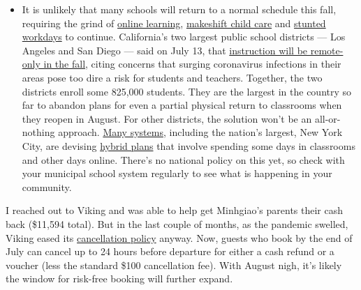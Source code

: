 \begin{itemize}
  \begin{itemize}
  \tightlist
  \item
    It is unlikely that many schools will return to a normal schedule
    this fall, requiring the grind of
    \href{https://www.nytimes3xbfgragh.onion/2020/06/05/us/coronavirus-education-lost-learning.html?action=click\&pgtype=Article\&state=default\&region=MAIN_CONTENT_3\&context=storylines_faq}{online
    learning},
    \href{https://www.nytimes3xbfgragh.onion/2020/05/29/us/coronavirus-child-care-centers.html?action=click\&pgtype=Article\&state=default\&region=MAIN_CONTENT_3\&context=storylines_faq}{makeshift
    child care} and
    \href{https://www.nytimes3xbfgragh.onion/2020/06/03/business/economy/coronavirus-working-women.html?action=click\&pgtype=Article\&state=default\&region=MAIN_CONTENT_3\&context=storylines_faq}{stunted
    workdays} to continue. California's two largest public school
    districts --- Los Angeles and San Diego --- said on July 13, that
    \href{https://www.nytimes3xbfgragh.onion/2020/07/13/us/lausd-san-diego-school-reopening.html?action=click\&pgtype=Article\&state=default\&region=MAIN_CONTENT_3\&context=storylines_faq}{instruction
    will be remote-only in the fall}, citing concerns that surging
    coronavirus infections in their areas pose too dire a risk for
    students and teachers. Together, the two districts enroll some
    825,000 students. They are the largest in the country so far to
    abandon plans for even a partial physical return to classrooms when
    they reopen in August. For other districts, the solution won't be an
    all-or-nothing approach.
    \href{https://bioethics.jhu.edu/research-and-outreach/projects/eschool-initiative/school-policy-tracker/}{Many
    systems}, including the nation's largest, New York City, are
    devising
    \href{https://www.nytimes3xbfgragh.onion/2020/06/26/us/coronavirus-schools-reopen-fall.html?action=click\&pgtype=Article\&state=default\&region=MAIN_CONTENT_3\&context=storylines_faq}{hybrid
    plans} that involve spending some days in classrooms and other days
    online. There's no national policy on this yet, so check with your
    municipal school system regularly to see what is happening in your
    community.
  \end{itemize}
\end{itemize}

I reached out to Viking and was able to help get Minhgiao's parents
their cash back (\$11,594 total). But in the last couple of months, as
the pandemic swelled, Viking eased its
\href{https://www.vikingcruises.com/oceans/risk-free-guarantee.html}{cancellation
policy} anyway. Now, guests who book by the end of July can cancel up to
24 hours before departure for either a cash refund or a voucher (less
the standard \$100 cancellation fee). With August nigh, it's likely the
window for risk-free booking will further expand.

